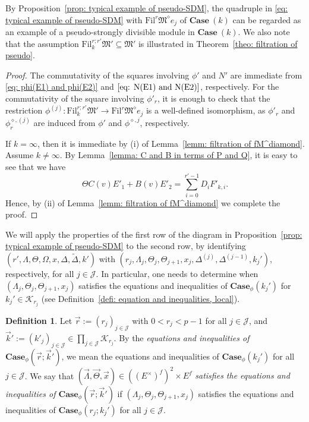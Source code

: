 \documentclass[11pt]{amsart}
\theoremstyle{definition}
\numberwithin{equation}{subsection}
\theoremstyle{plain}
\theoremstyle{plain}
\theoremstyle{plain}
\theoremstyle{plain}
\theoremstyle{plain}
\theoremstyle{plain}
\theoremstyle{plain}
\theoremstyle{plain}
\theoremstyle{plain}
\theoremstyle{plain}
\theoremstyle{plain}
\theoremstyle{plain}
\theoremstyle{definition}
\newtheorem{defi}[equation]{Definition}
\theoremstyle{definition}
\theoremstyle{definition}
\theoremstyle{remark}
\renewcommand{\(}{\textup{(}}
\renewcommand{\)}{\textup{)}}
\newcommand{\fM}{\mathfrak{M}}
\newcommand{\Fil}{\mathrm{Fil}}
\newcommand{\cJ}{\mathcal{J}}
\newcommand{\vx}{\vec{x}}
\newcommand{\vr}{\vec{r}}
\newcommand{\vk}{\vec{k}}
\newcommand{\cK}{\mathcal{K}}
\newcommand{\vLam}{\vec{\Lambda}}
\newcommand{\vTh}{\vec{\Theta}}
\begin{document}
By Proposition~\ref{prop: typical example of pseudo-SDM}, the quadruple in \eqref{eq: typical example of pseudo-SDM} with $\Fil^r \fM^\diamond e_j$ of $\mathbf{Case}~(k)$ can be regarded as an example of a pseudo-strongly divisible module in $\mathbf{Case}~(k)$. We also note that the assumption $\Fil^{r;r'}_k\fM'\subseteq\fM'$ is illustrated in Theorem~\ref{theo: filtration of pseudo}.

\begin{proof}
The commutativity of the squares involving $\phi'$ and $N'$ are immediate from \eqref{eq: phi(E1) and phi(E2)} and $\eqref{eq: N(E1) and N(E2)}$, respectively. For the commutativity of the square involving $\phi'_r$, it is enough to check that the restriction $\phi^{(j)}:\Fil^{r;r'}_k\fM'\rightarrow \Fil^r\fM^{\diamond}e_{j}$ is a well-defined isomorphism, as $\phi'_r$ and $\phi_r^{\diamond,(j)}$ are induced from $\phi'$ and $\phi^{\diamond,j}$, respectively.

If $k=\infty$, then it is immediate by (i) of Lemma~\ref{lemm: filtration of fM^diamond}. Assume $k\neq \infty$. By Lemma~\ref{lemma: C and B in terms of P and Q}, it is easy to see that we have
$$\Theta C(v)E'_1+B(v)E'_2 =\sum_{i=0}^{r'-1} D_i F'_{k,i}.$$
Hence, by (ii) of Lemma~\ref{lemm: filtration of fM^diamond} we complete the proof.
\end{proof}

We will apply the properties of the first row of the diagram in Proposition~\ref{prop: typical example of pseudo-SDM} to the second row, by identifying $(r',\Lambda,\Theta,\Omega,x,\Delta,\tilde\Delta,k')$ with $(r_j,\Lambda_j,\Theta_j,\Theta_{j+1},x_j,\Delta^{(j)},\Delta^{(j-1)},k_j')$, respectively, for all $j\in\cJ$. In particular, one needs to determine when $(\Lambda_j,\Theta_j,\Theta_{j+1},x_j)$ satisfies the equations and inequalities of $\mathbf{Case}_\phi(k_j')$ for $k_j'\in\cK_{r_j}$ (see Definition~\ref{defi: equation and inequalities, local}).

\begin{defi}
Let $\vr:=(r_j)_{j\in\cJ}$ with $0<r_j<p-1$ for all $j\in\cJ$, and $\vk':=(k'_j)_{j\in\cJ}\in\prod_{j\in\cJ}\cK_{r_j}$.
By the \emph{equations and inequalities of $\mathbf{Case}_\phi(\vr;\vk')$}, we mean the equations and inequalities of $\mathbf{Case}_\phi(k_j')$ for all $j\in\cJ$. We say that $(\vLam,\vTh,\vx)\in ((E^\times)^f)^{2}\times E^f$ \emph{satisfies the equations and inequalities of $\mathbf{Case}_\phi(\vr;\vk')$} if $(\Lambda_j,\Theta_j,\Theta_{j+1},x_j)$ satisfies the equations and inequalities of $\mathbf{Case}_\phi(r_j;k_j')$ for all $j\in\cJ$.
\end{defi}
\end{document}
